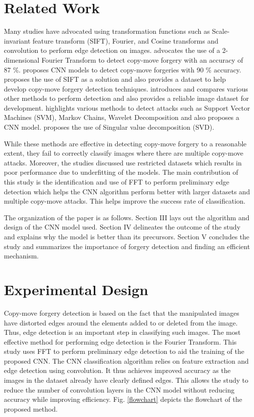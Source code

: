 \documentclass[conference]{IEEEtran}
\begin{document}
\section{Related Work}
Many studies have advocated using transformation functions such as Scale-invariant feature transform (SIFT), Fourier, and Cosine transforms \cite{b1} and convolution to perform edge detection on images. \cite{b2} advocates the use of a 2-dimensional Fourier Transform to detect copy-move forgery with an accuracy of 87 \%. \cite{b3} proposes CNN models to detect copy-move forgeries with 90 \% accuracy. \cite{b4} proposes the use of SIFT as a solution and also provides a dataset to help develop copy-move forgery detection techniques. \cite{b5} introduces and compares various other methods to perform detection and also provides a reliable image dataset for development. \cite{b6} highlights various methods to detect attacks such as Support Vector Machines (SVM), Markov Chains, Wavelet Decomposition and also proposes a CNN model. \cite{b8} proposes the use of Singular value decomposition (SVD). 

While these methods are effective in detecting copy-move forgery to a reasonable extent, they fail to correctly classify images where there are multiple copy-move attacks. Moreover, the studies discussed use restricted datasets which results in poor performance due to underfitting of the models. The main contribution of this study is the identification and use of FFT to perform preliminary edge detection which helps the CNN algorithm perform better with larger datasets and multiple copy-move attacks. This helps improve the success rate of classification.

The organization of the paper is as follows. Section III lays out the algorithm and design of the CNN model used. Section IV delineates the outcome of the study and explains why the model is better than its precursors. Section V concludes the study and summarizes the importance of forgery detection and finding an efficient mechanism.

\section{Experimental Design}
Copy-move forgery detection is based on the fact that the manipulated images have distorted edges around the elements added to or deleted from the image. Thus, edge detection is an important step in classifying such images. The most effective method for performing edge detection is the Fourier Transform. This study uses FFT to perform preliminary edge detection to aid the training of the proposed CNN. The CNN classification algorithm relies on feature extraction and edge detection using convolution. It thus achieves improved accuracy as the images in the dataset already have clearly defined edges. This allows the study to reduce the number of convolution layers in the CNN model without reducing accuracy while improving efficiency. Fig. \ref{flowchart} depicts the flowchart of the proposed method.
\end{document}
